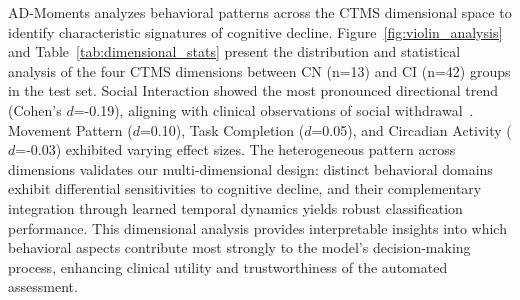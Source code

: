 \documentclass[sigconf, anonymous, 9pt, nonacm]{acmart}
\newcommand{\sys}{AD-Moments\xspace}
\begin{document}
\sys analyzes behavioral patterns across the CTMS dimensional space to identify characteristic signatures of cognitive decline. Figure~\ref{fig:violin_analysis} and Table~\ref{tab:dimensional_stats} present the distribution and statistical analysis of the four CTMS dimensions between CN (n=13) and CI (n=42) groups in the test set. Social Interaction showed the most pronounced directional trend (Cohen's $d$=-0.19), aligning with clinical observations of social withdrawal~\cite{Shafighi2023SocialIsolationAD}. Movement Pattern ($d$=0.10), Task Completion ($d$=0.05), and Circadian Activity ($d$=-0.03) exhibited varying effect sizes.
The heterogeneous pattern across dimensions validates our multi-dimensional design: distinct behavioral domains exhibit differential sensitivities to cognitive decline, and their complementary integration through learned temporal dynamics yields robust classification performance. This dimensional analysis provides interpretable insights into which behavioral aspects contribute most strongly to the model's decision-making process, enhancing clinical utility and trustworthiness of the automated assessment.
\end{document}
